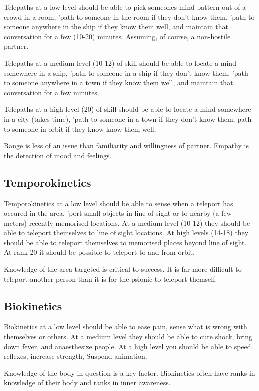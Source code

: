 \documentclass{book}
\begin{document}
Telepaths at a low level should be able to pick someones mind
pattern out of a crowd in a room, 'path to someone in
the room if they don't know them, 'path to someone anywhere 
in the ship if they know them well, and maintain that conversation
for a few (10-20) minutes. Assuming, of course, a non-hostile partner.

Telepaths at a medium level (10-12) of skill should be 
able to locate a mind somewhere in a ship, 'path to someone in a 
ship if they don't know them, 'path to someone anywhere in a town 
if they know them well, and maintain that conversation for 
a few minutes.

Telepaths at a high level (20) of skill should be able 
to locate a mind somewhere in a city (takes time), 'path to someone
in a town if they don't know them, path to someone in orbit if they know
know them well.

Range is less of an issue than familiarity and willingness of partner.
Empathy is the detection of mood and feelings. 

\subsection{Temporokinetics}

Temporokinetics at a low level should be able to sense when a teleport 
has occured in the area, 'port small objects in line of sight or to
nearby (a few meters) recently memorised locations. At a medium level (10-12) 
they should be able to teleport themselves to line of sight locations. At 
high levels (14-18) they should be able to teleport themselves to memorised 
places beyond line of sight. At rank 20 it should be possible to teleport to 
and from orbit.

Knowledge of the area targeted is critical to success. It is far more
difficult to teleport another person than it is for the psionic to teleport
themself.

\subsection{Biokinetics}

Biokinetics at a low level should be able to ease pain, sense what is wrong 
with themselves or others. At a medium level they should be able to cure shock,
bring down fever, and anaesthesize people. At a high level you should be able 
to speed reflexes, increase strength, Suspend animation. 

Knowledge of the body in question is a key factor. Biokinetics often
have ranks in knowledge of their body and ranks in inner awareness. 
\end{document}
